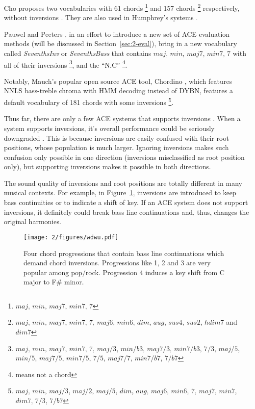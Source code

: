 Cho \cite{cho2014improved} proposes two vocabularies with 61 chords \footnote{$maj$, $min$, $maj7$, $min7$, $7$} and 157 chords \footnote{$maj$, $min$, $maj7$, $min7$, $7$, $maj6$, $min6$, $dim$, $aug$, $sus4$, $sus2$, $hdim7$ and $dim7$} respectively, without inversions \cite{burgoyne2014comparative}. They are also used in Humphrey's systems \cite{humphreyfour,humphrey2015exploration}.

Pauwel and Peeters \cite{pauwels2013evaluating}, in an effort to introduce a new set of ACE evaluation methods (will be discussed in Section~\ref{sec:2-eval}), bring in a new vocabulary called \textit{SeventhsInv} or \textit{SeventhsBass} that contains $maj$, $min$, $maj7$, $min7$, $7$ with all of their inversions \footnote{$maj$, $min$, $maj7$, $min7$, $7$, $maj/3$, $min/b3$, $maj7/3$, $min7/b3$, $7/3$, $maj/5$, $min/5$, $maj7/5$, $min7/5$, $7/5$, $maj7/7$, $min7/b7$, $7/b7$}, and the ``N.C'' \footnote{means not a chord}.

Notably, Mauch's popular open source ACE tool, Chordino \cite{cannam2010sonic}, which features NNLS bass-treble chroma with HMM decoding instead of DYBN, features a default vocabulary of 181 chords with some inversions \footnote{$maj$, $min$, $maj/3$, $maj/2$, $maj/5$, $dim$, $aug$, $maj6$, $min6$, $7$, $maj7$, $min7$, $dim7$, $7/3$, $7/b7$}.


Thus far, there are only a few ACE systems that supports inversions \cite{cannam2010sonic,mauch2010automatic,ni2012end,mcvicar2013machine,deng2016chord,deng2016hybrid}. When a system supports inversions, it's overall performance could be seriously downgraded \cite{deng2016chord}. This is because inversions are easily confused with their root positions, whose population is much larger. Ignoring inversions makes such confusion only possible in one direction (inversions misclassified as root position only), but supporting inversions makes it possible in both directions.

The sound quality of inversions and root positions are totally different in many musical contexts. For example, in Figure~\ref{fig:2-wdwu}, inversions are introduced to keep bass continuities or to indicate a shift of key. If an ACE system does not support inversions, it definitely could break bass line continuations and, thus, changes the original harmonies.
\begin{figure}[htb]
\centering
\texttt{[image: 2/figures/wdwu.pdf]}
\caption{Four chord progressions that contain bass line continuations which demand chord inversions. Progressions like 1, 2 and 3 are very popular among pop/rock. Progression 4 induces a key shift from C major to F\# minor.}
\label{fig:2-wdwu}
\end{figure}

